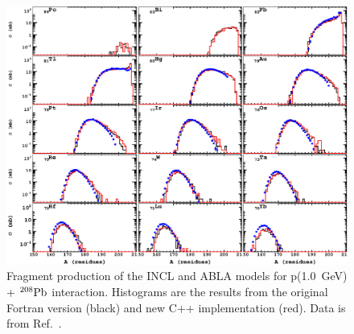 \documentclass[a4paper]{jpconf}
\begin{document}
\begin{figure}[h]
\begin{center}
\includegraphics[scale=0.80]{poster/images/pPbIsotopes.eps}

\caption{\label{fig:fragisotopes}Fragment production of the INCL and ABLA  models 
for p(1.0~GeV) + $^{208}{\rm Pb}$ interaction.
Histograms are the results from the original Fortran version (black)
and new C++ implementation (red). Data is from Ref.~\cite{gsifragments}.}

\end{center}
\end{figure}
\end{document}
